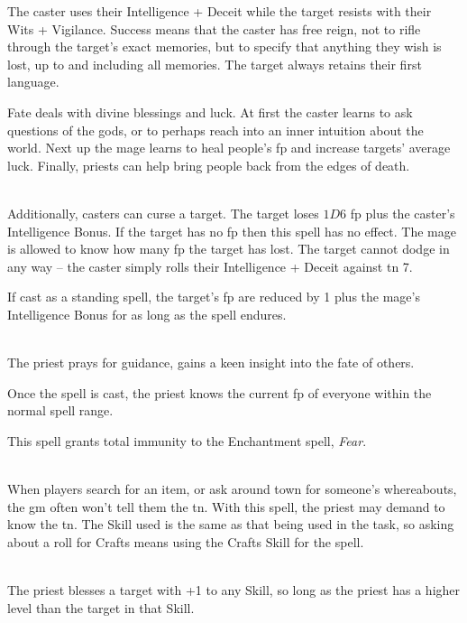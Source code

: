 \begin{multicols}{2}
The caster uses their Intelligence + Deceit while the target resists with their Wits + Vigilance. Success means that the caster has free reign, not to rifle through the target's exact memories, but to specify that anything they wish is lost, up to and including all memories. The target always retains their first language.

\end{multicols}

Fate deals with divine blessings and luck. At first the caster learns to ask questions of the gods, or to perhaps reach into an inner intuition about the world. Next up the mage learns to heal people's \gls{fp} and increase targets' average luck. Finally, priests can help bring people back from the edges of death.
\begin{multicols}{2}

\spelllevel

\\
Additionally, casters can curse a target. The target loses $1D6$ \gls{fp} plus the caster's Intelligence Bonus. If the target has no \gls{fp} then this spell has no effect. The mage is allowed to know how many \gls{fp} the target has lost. The target cannot dodge in any way -- the caster simply rolls their Intelligence + Deceit against \gls{tn} 7.

If cast as a standing spell, the target's \gls{fp} are reduced by 1 plus the mage's Intelligence Bonus for as long as the spell endures.

\\
The priest prays for guidance, gains a keen insight into the fate of others.

Once the spell is cast, the priest knows the current \gls{fp} of everyone within the normal spell range.

This spell grants total immunity to the Enchantment spell, \textit{Fear}.

\\
When players search for an item, or ask around town for someone's whereabouts, the \gls{gm} often won't tell them the \gls{tn}.  With this spell, the priest may demand to know the \gls{tn}.  The Skill used is the same as that being used in the task, so asking about a roll for Crafts means using the Crafts Skill for the spell.

\\
The priest blesses a target with +1 to any Skill, so long as the priest has a higher level than the target in that Skill.


\end{multicols}

